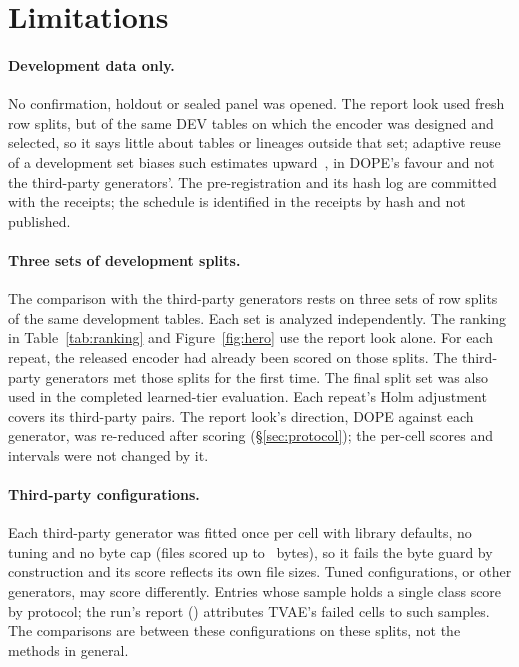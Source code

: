 \section{Limitations}\label{sec:limits}

\paragraph{Development data only.}
No confirmation, holdout or sealed panel was opened.
The report look used fresh row splits, but of the same DEV tables on which the encoder was designed and selected, so it says little about tables or lineages outside that set; adaptive reuse of a development set biases such estimates upward~\citep{dwork2015reusable}, in DOPE's favour and not the third-party generators'.
The pre-registration and its hash log are committed with the receipts; the schedule is identified in the receipts by hash and not published.

\paragraph{Three sets of development splits.}
The comparison with the third-party generators rests on three sets of row splits of the same development tables. Each set is analyzed independently.
The ranking in Table~\ref{tab:ranking} and Figure~\ref{fig:hero} use the report look alone.
For each repeat, the released encoder had already been scored on those splits. The third-party generators met those splits for the first time. The final split set was also used in the completed learned-tier evaluation.
Each repeat's Holm adjustment covers its  third-party pairs.
The report look's direction, DOPE against each generator, was re-reduced after scoring (\S\ref{sec:protocol}); the per-cell scores and intervals were not changed by it.

\paragraph{Third-party configurations.}
Each third-party generator was fitted once per cell with library defaults, no tuning and no byte cap (files scored up to ~bytes), so it fails the byte guard by construction and its score reflects its own file sizes.
Tuned configurations, or other generators, may score differently.
Entries whose sample holds a single class score  by protocol; the run's report () attributes TVAE's failed cells to such samples.
The comparisons are between these configurations on these splits, not the methods in general.

